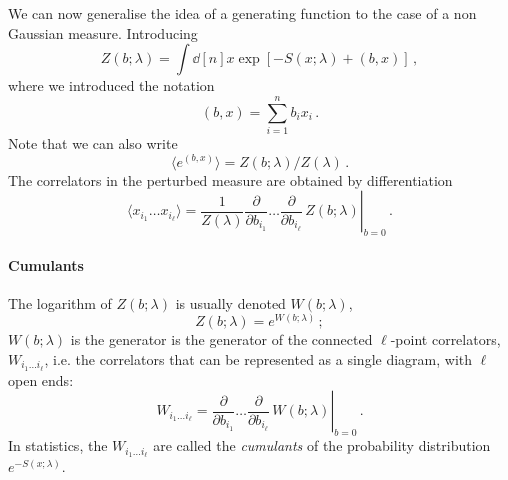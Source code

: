 \documentclass[notes.tex]{subfiles}
\begin{document}
We can now generalise the idea of a generating function to the case of
a non Gaussian measure. Introducing
\begin{equation}
  \label{eq:GenFunctPert}
  Z(b;\lambda) = \int \dd[n]{x} \exp\left[
    -S(x;\lambda) + (b,x)
    \right]\, ,
\end{equation}
where we introduced the notation
\begin{equation}
  \label{eq:ScalProd}
  (b,x) = \sum_{i=1}^n b_i x_i\, .
\end{equation}
Note that we can also write
\begin{equation}
  \label{eq:GenFunctPertTwo}
  \langle e^{(b,x)} \rangle = Z(b;\lambda)/Z(\lambda)\, .
\end{equation}
The correlators in the perturbed measure are obtained by
differentiation
\begin{equation}
  \label{eq:CorrGenPert}
  \langle x_{i_1} \ldots x_{i_\ell}\rangle = \frac{1}{Z(\lambda)} \left.
  \frac{\partial}{\partial b_{i_1}} \ldots \frac{\partial}{\partial b_{i_\ell}}\,
  Z(b;\lambda)
  \right|_{b=0} \, .
\end{equation}

\paragraph{Cumulants}

The logarithm of $Z(b;\lambda)$ is usually denoted $W(b;\lambda)$,
\begin{equation}
  \label{eq:WGenDef}
  Z(b;\lambda) = e^{W(b;\lambda)}\, ;
\end{equation}
$W(b;\lambda)$ is the generator is the generator of the connected
$\ell$-point correlators, $W_{i_1 \ldots i_\ell}$, i.e. the correlators that can be represented as a single
diagram, with $\ell$ open ends:
\begin{equation}
  \label{eq:DiffWGen}
  W_{i_1 \ldots i_\ell} = \left.
  \frac{\partial}{\partial b_{i_1}} \ldots \frac{\partial}{\partial b_{i_\ell}}\,
  W(b;\lambda)
  \right|_{b=0} \, .
\end{equation}
In statistics, the $W_{i_1 \ldots i_\ell}$ are called the {\em
    cumulants} of the probability distribution $e^{-S(x;\lambda)}$.
\end{document}
